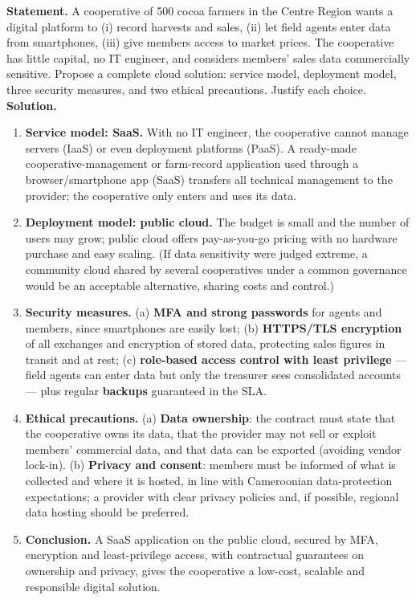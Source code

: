 \documentclass[11pt]{article}
\begin{document}
\begin{exoresolu}
\textbf{Statement.} A cooperative of 500 cocoa farmers in the Centre Region wants a digital platform to (i) record harvests and sales, (ii) let field agents enter data from smartphones, (iii) give members access to market prices. The cooperative has little capital, no IT engineer, and considers members' sales data commercially sensitive. Propose a complete cloud solution: service model, deployment model, three security measures, and two ethical precautions. Justify each choice.
\tcblower
\textbf{Solution.}
\begin{enumerate}
\item \textbf{Service model: SaaS.} With no IT engineer, the cooperative cannot manage servers (IaaS) or even deployment platforms (PaaS). A ready-made cooperative-management or farm-record application used through a browser/smartphone app (SaaS) transfers all technical management to the provider; the cooperative only enters and uses its data.
\item \textbf{Deployment model: public cloud.} The budget is small and the number of users may grow; public cloud offers pay-as-you-go pricing with no hardware purchase and easy scaling. (If data sensitivity were judged extreme, a community cloud shared by several cooperatives under a common governance would be an acceptable alternative, sharing costs and control.)
\item \textbf{Security measures.} (a) \textbf{MFA and strong passwords} for agents and members, since smartphones are easily lost; (b) \textbf{HTTPS/TLS encryption} of all exchanges and encryption of stored data, protecting sales figures in transit and at rest; (c) \textbf{role-based access control with least privilege} --- field agents can enter data but only the treasurer sees consolidated accounts --- plus regular \textbf{backups} guaranteed in the SLA.
\item \textbf{Ethical precautions.} (a) \textbf{Data ownership}: the contract must state that the cooperative owns its data, that the provider may not sell or exploit members' commercial data, and that data can be exported (avoiding vendor lock-in). (b) \textbf{Privacy and consent}: members must be informed of what is collected and where it is hosted, in line with Cameroonian data-protection expectations; a provider with clear privacy policies and, if possible, regional data hosting should be preferred.
\item \textbf{Conclusion.} A SaaS application on the public cloud, secured by MFA, encryption and least-privilege access, with contractual guarantees on ownership and privacy, gives the cooperative a low-cost, scalable and responsible digital solution.
\end{enumerate}
\end{exoresolu}
\end{document}
